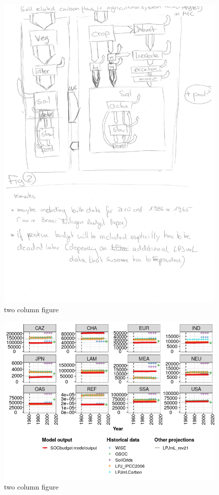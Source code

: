 \documentclass[gc, manuscript]{copernicus}
\begin{document}
\begin{figure}
\includegraphics[width=12cm]{images/figs_draft-3} \caption{two column figure}\label{fig:unnamed-chunk-8}
\end{figure}

\begin{figure}
\includegraphics[width=12cm]{images/RegionPlot+Valid} \caption{two column figure}\label{fig:unnamed-chunk-9}
\end{figure}
\end{document}
